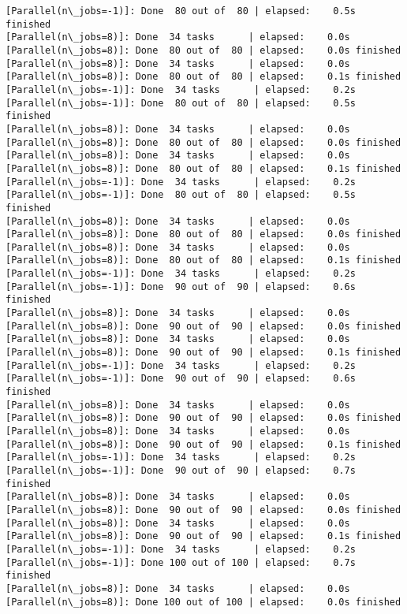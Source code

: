 \documentclass[11pt]{article}
\begin{document}
\begin{Verbatim}[commandchars=\\\{\}]
[Parallel(n\_jobs=-1)]: Done  80 out of  80 | elapsed:    0.5s finished
[Parallel(n\_jobs=8)]: Done  34 tasks      | elapsed:    0.0s
[Parallel(n\_jobs=8)]: Done  80 out of  80 | elapsed:    0.0s finished
[Parallel(n\_jobs=8)]: Done  34 tasks      | elapsed:    0.0s
[Parallel(n\_jobs=8)]: Done  80 out of  80 | elapsed:    0.1s finished
[Parallel(n\_jobs=-1)]: Done  34 tasks      | elapsed:    0.2s
[Parallel(n\_jobs=-1)]: Done  80 out of  80 | elapsed:    0.5s finished
[Parallel(n\_jobs=8)]: Done  34 tasks      | elapsed:    0.0s
[Parallel(n\_jobs=8)]: Done  80 out of  80 | elapsed:    0.0s finished
[Parallel(n\_jobs=8)]: Done  34 tasks      | elapsed:    0.0s
[Parallel(n\_jobs=8)]: Done  80 out of  80 | elapsed:    0.1s finished
[Parallel(n\_jobs=-1)]: Done  34 tasks      | elapsed:    0.2s
[Parallel(n\_jobs=-1)]: Done  80 out of  80 | elapsed:    0.5s finished
[Parallel(n\_jobs=8)]: Done  34 tasks      | elapsed:    0.0s
[Parallel(n\_jobs=8)]: Done  80 out of  80 | elapsed:    0.0s finished
[Parallel(n\_jobs=8)]: Done  34 tasks      | elapsed:    0.0s
[Parallel(n\_jobs=8)]: Done  80 out of  80 | elapsed:    0.1s finished
[Parallel(n\_jobs=-1)]: Done  34 tasks      | elapsed:    0.2s
[Parallel(n\_jobs=-1)]: Done  90 out of  90 | elapsed:    0.6s finished
[Parallel(n\_jobs=8)]: Done  34 tasks      | elapsed:    0.0s
[Parallel(n\_jobs=8)]: Done  90 out of  90 | elapsed:    0.0s finished
[Parallel(n\_jobs=8)]: Done  34 tasks      | elapsed:    0.0s
[Parallel(n\_jobs=8)]: Done  90 out of  90 | elapsed:    0.1s finished
[Parallel(n\_jobs=-1)]: Done  34 tasks      | elapsed:    0.2s
[Parallel(n\_jobs=-1)]: Done  90 out of  90 | elapsed:    0.6s finished
[Parallel(n\_jobs=8)]: Done  34 tasks      | elapsed:    0.0s
[Parallel(n\_jobs=8)]: Done  90 out of  90 | elapsed:    0.0s finished
[Parallel(n\_jobs=8)]: Done  34 tasks      | elapsed:    0.0s
[Parallel(n\_jobs=8)]: Done  90 out of  90 | elapsed:    0.1s finished
[Parallel(n\_jobs=-1)]: Done  34 tasks      | elapsed:    0.2s
[Parallel(n\_jobs=-1)]: Done  90 out of  90 | elapsed:    0.7s finished
[Parallel(n\_jobs=8)]: Done  34 tasks      | elapsed:    0.0s
[Parallel(n\_jobs=8)]: Done  90 out of  90 | elapsed:    0.0s finished
[Parallel(n\_jobs=8)]: Done  34 tasks      | elapsed:    0.0s
[Parallel(n\_jobs=8)]: Done  90 out of  90 | elapsed:    0.1s finished
[Parallel(n\_jobs=-1)]: Done  34 tasks      | elapsed:    0.2s
[Parallel(n\_jobs=-1)]: Done 100 out of 100 | elapsed:    0.7s finished
[Parallel(n\_jobs=8)]: Done  34 tasks      | elapsed:    0.0s
[Parallel(n\_jobs=8)]: Done 100 out of 100 | elapsed:    0.0s finished

\end{Verbatim}
\end{document}
